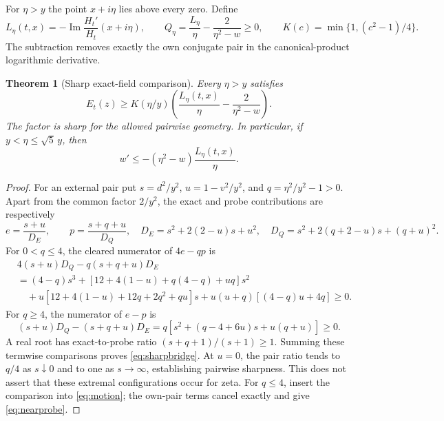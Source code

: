 \documentclass[11pt]{article}
\numberwithin{equation}{section}
\newtheorem{theorem}{Theorem}[section]
\theoremstyle{definition}
\theoremstyle{remark}
\DeclareMathOperator{\Ima}{Im}
\begin{document}
For $\eta>y$ the point $x+i\eta$ lies above every zero. Define
\begin{equation}\label{eq:probe}
 L_\eta(t,x)=-\Ima\frac{H_t'}{H_t}(x+i\eta),\qquad
 Q_\eta=\frac{L_\eta}{\eta}-\frac2{\eta^2-w}\ge0,
 \qquad K(c)=\min\{1,(c^2-1)/4\}.
\end{equation}
The subtraction removes exactly the own conjugate pair in the
canonical-product logarithmic derivative.

\begin{theorem}[Sharp exact-field comparison]\label{thm:probe}
Every $\eta>y$ satisfies
\begin{equation}\label{eq:sharpbridge}
 E_t(z)\ge K(\eta/y)
 \left(\frac{L_\eta(t,x)}{\eta}-\frac2{\eta^2-w}\right).
\end{equation}
The factor is sharp for the allowed pairwise geometry. In particular,
if $y<\eta\le\sqrt5\,y$, then
\begin{equation}\label{eq:nearprobe}
 w'\le-(\eta^2-w)\frac{L_\eta(t,x)}{\eta}.
\end{equation}
\end{theorem}
\begin{proof}
For an external pair put $s=d^2/y^2$, $u=1-v^2/y^2$, and
$q=\eta^2/y^2-1>0$. Apart from the common factor $2/y^2$,
the exact and probe contributions are respectively
\[
 e=\frac{s+u}{D_E},\qquad p=\frac{s+q+u}{D_Q},\quad
 D_E=s^2+2(2-u)s+u^2,\quad
 D_Q=s^2+2(q+2-u)s+(q+u)^2.
\]
For $0<q\le4$, the cleared numerator of $4e-qp$ is
\begin{align*}
 &4(s+u)D_Q-q(s+q+u)D_E\\
 &=(4-q)s^3+[12+4(1-u)+q(4-q)+uq]s^2\\
 &\quad+u[12+4(1-u)+12q+2q^2+qu]s
       +u(u+q)[(4-q)u+4q]\ge0.
\end{align*}
For $q\ge4$, the numerator of $e-p$ is
\[
 (s+u)D_Q-(s+q+u)D_E
 =q[s^2+(q-4+6u)s+u(q+u)]\ge0.
\]
A real root has exact-to-probe ratio $(s+q+1)/(s+1)\ge1$.
Summing these termwise comparisons proves \eqref{eq:sharpbridge}.
At $u=0$, the pair ratio tends to $q/4$ as $s\downarrow0$ and
to one as $s\to\infty$, establishing pairwise sharpness. This
does not assert that these extremal configurations occur for zeta.
For $q\le4$, insert the comparison into \eqref{eq:motion}; the
own-pair terms cancel exactly and give \eqref{eq:nearprobe}.
\end{proof}
\end{document}
